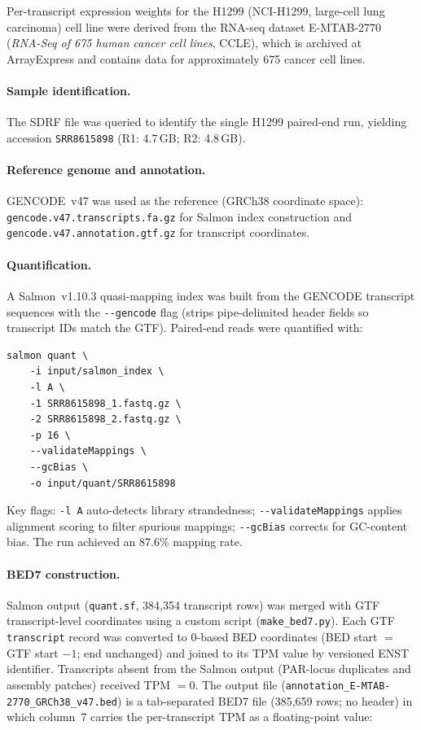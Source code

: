 Per-transcript expression weights for the H1299 (NCI-H1299, large-cell lung carcinoma) cell line were derived from the RNA-seq dataset E-MTAB-2770 (\textit{RNA-Seq of 675 human cancer cell lines}, CCLE), which is archived at ArrayExpress and contains data for approximately 675 cancer cell lines.

\paragraph{Sample identification.}
The SDRF file was queried to identify the single H1299 paired-end run, yielding accession \texttt{SRR8615898} (R1: 4.7\,GB; R2: 4.8\,GB).

\paragraph{Reference genome and annotation.}
GENCODE~v47 was used as the reference (GRCh38 coordinate space): \texttt{gencode.v47.transcripts.fa.gz} for Salmon index construction and \texttt{gencode.v47.annotation.gtf.gz} for transcript coordinates.

\paragraph{Quantification.}
A Salmon~v1.10.3 quasi-mapping index was built from the GENCODE transcript sequences with the \texttt{-{}-gencode} flag (strips pipe-delimited header fields so transcript IDs match the GTF).
Paired-end reads were quantified with:

\begin{verbatim}
salmon quant \
    -i input/salmon_index \
    -l A \
    -1 SRR8615898_1.fastq.gz \
    -2 SRR8615898_2.fastq.gz \
    -p 16 \
    --validateMappings \
    --gcBias \
    -o input/quant/SRR8615898
\end{verbatim}

\noindent Key flags: \texttt{-l~A} auto-detects library strandedness; \texttt{-{}-validateMappings} applies alignment scoring to filter spurious mappings; \texttt{-{}-gcBias} corrects for GC-content bias.
The run achieved an 87.6\% mapping rate.

\paragraph{BED7 construction.}
Salmon output (\texttt{quant.sf}, 384{,}354 transcript rows) was merged with GTF transcript-level coordinates using a custom script (\texttt{make\_bed7.py}).
Each GTF \texttt{transcript} record was converted to 0-based BED coordinates (BED start $=$ GTF start $- 1$; end unchanged) and joined to its TPM value by versioned ENST identifier.
Transcripts absent from the Salmon output (PAR-locus duplicates and assembly patches) received TPM $= 0$.
The output file (\texttt{annotation\_E-MTAB-2770\_GRCh38\_v47.bed}) is a tab-separated BED7 file (385{,}659 rows; no header) in which column~7 carries the per-transcript TPM as a floating-point value:


